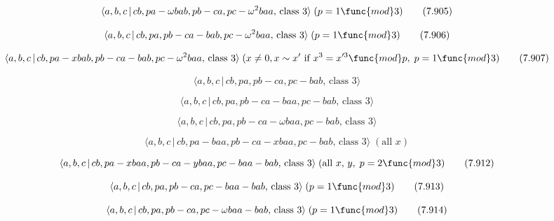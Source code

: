\documentclass[10pt]{article}
\begin{document}
\begin{equation}
\langle a,b,c\,|\,cb,pa-\omega bab,pb-ca,pc-\omega ^{2}baa,\,\text{class }%
3\rangle \;(p=1\func{mod}3)  \tag{7.905}
\end{equation}

\begin{equation}
\langle a,b,c\,|\,cb,pa,pb-ca-bab,pc-\omega ^{2}baa,\,\text{class }3\rangle
\;(p=1\func{mod}3)  \tag{7.906}
\end{equation}

\begin{equation}
\langle a,b,c\,|\,cb,pa-xbab,pb-ca-bab,pc-\omega ^{2}baa,\,\text{class }%
3\rangle \;(x\neq 0,x \sim x^{\prime }\text{ if }x^3=x^{\prime 3}\func{mod}%
p,\;p=1\func{mod}3)  \tag{7.907}
\end{equation}

\begin{equation}
\langle a,b,c\,|\,cb,pa,pb-ca,pc-bab,\,\text{class }3\rangle  \tag{7.908}
\end{equation}

\begin{equation}
\langle a,b,c\,|\,cb,pa,pb-ca-baa,pc-bab,\,\text{class }3\rangle  \tag{7.909}
\end{equation}

\begin{equation}
\langle a,b,c\,|\,cb,pa,pb-ca-\omega baa,pc-bab,\,\text{class }3\rangle 
\tag{7.910}
\end{equation}

\begin{equation}
\langle a,b,c\,|\,cb,pa-baa,pb-ca-xbaa,pc-bab,\,\text{class }3\rangle \;(%
\text{all }x)  \tag{7.911}
\end{equation}

\begin{equation}
\langle a,b,c\,|\,cb,pa-xbaa,pb-ca-ybaa,pc-baa-bab,\,\text{class }3\rangle
\;(\text{all }x,\,y,\;p=2\func{mod}3)  \tag{7.912}
\end{equation}

\begin{equation}
\langle a,b,c\,|\,cb,pa,pb-ca,pc-baa-bab,\,\text{class }3\rangle \;(p=1 
\func{mod} 3)  \tag{7.913}
\end{equation}

\begin{equation}
\langle a,b,c\,|\,cb,pa,pb-ca,pc-\omega baa-bab,\,\text{class }3\rangle
\;(p=1\func{mod}3)  \tag{7.914}
\end{equation}
\end{document}
